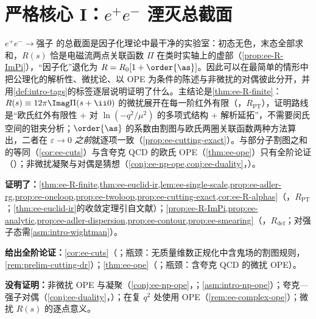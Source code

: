 \chapter{严格核心 I：$e^+e^-$ 湮灭总截面}\label{ch:ee}

$e^+e^-\to\text{强子}$ 的总截面是因子化理论中最干净的实验室：初态无色，末态全部求和，$R(s)$ 恰是电磁流两点关联函数 $\Pi$ 在类时实轴上的虚部（\cref{prop:ee-R-ImPi}），“因子化”退化为 $R=R_0[1+\order{\as}]$。因此可以在最简单的情形中把公理化的解析性、微扰论、以 OPE 为条件的陈述与非微扰的对偶彼此分开，并用\cref{def:intro-tags}的标签逐层说明证明了什么。主结论是\cref{thm:ee-R-finite}：$R(s)\equiv12\pi\Imag\Pi(s+\ii0)$ 的微扰展开在每一阶红外有限（\tagR，$R_{\mathrm{PT}}$），证明路线是“欧氏红外有限性 $+$ 对 $\ln(-q^2/\mu^2)$ 的多项式结构 $+$ 解析延拓”，不需要闵氏空间的钳夹分析；$\order{\as}$ 的系数由割图与欧氏两圈关联函数两种方法算出，二者在 $\varepsilon\to0$ \emph{之前}就逐项一致（\cref{prop:ee-cutting-exact}）。与部分子割图之和的等同（\cref{cor:ee-cuts}）与含夸克 QCD 的欧氏 OPE（\cref{thm:ee-ope}）只有全阶论证（\tagA）；非微扰凝聚与对偶是猜想（\cref{conj:ee-np-ope,conj:ee-duality}，\tagC）。

\begin{tcolorbox}[enhanced,breakable,title=本章证明了什么／没有证明什么,fonttitle=\bfseries,
  colback=gray!3!white,colframe=gray!55!black,boxrule=0.6pt,arc=2pt,
  left=5pt,right=5pt,top=3pt,bottom=3pt,before skip=6pt,after skip=6pt]
\textbf{证明了：}\cref{thm:ee-R-finite,thm:ee-euclid-ir,lem:ee-single-scale,prop:ee-adler-rg,prop:ee-oneloop,prop:ee-twoloop,prop:ee-cutting-exact,cor:ee-R-alphas}（\tagR，$R_{\mathrm{PT}}$；\cref{thm:ee-euclid-ir}的收敛定理引自文献）；\cref{prop:ee-R-ImPi,prop:ee-analytic,prop:ee-adler-dispersion,prop:ee-contour,prop:ee-smearing}（\tagR，$R_{\mathrm{def}}$；对强子态需\cref{asm:intro-wightman}）。\par
\textbf{给出全阶论证：}\cref{cor:ee-cuts}（\tagA；瓶颈：无质量维数正规化中含鬼场的割图规则，\cref{rem:prelim-cutting-dr}）；\cref{thm:ee-ope}（\tagA；瓶颈：含夸克 QCD 的微扰 OPE）。\par
\textbf{没有证明：}非微扰 OPE 与凝聚（\cref{conj:ee-np-ope}，\tagC；\cref{asm:intro-np-ope}）；夸克—强子对偶（\cref{conj:ee-duality}，\tagC）；在复 $q^2$ 处使用 OPE（\cref{rem:ee-complex-ope}）；微扰 $R(s)$ 的逐点意义。
\end{tcolorbox}

